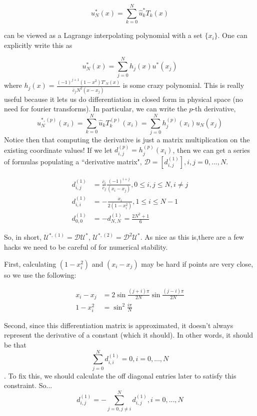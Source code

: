 \documentclass[12pt]{article}
\begin{document}
\begin{equation}
    u^*_{N}(x) = \sum_{k=0}^{N} \hat{u}^*_k T_k(x)
\end{equation}

can be viewed as a Lagrange interpolating polynomial with a set $\{x_i\}$. One can explicitly write this as

\begin{equation}
    u^*_{N}(x) = \sum_{j=0}^{N} h_j(x)u^*(x_j)
\end{equation}
where $h_j(x) = \frac{(-1)^{j+1}(1-x^2)T'_N(x)}{\bar{c}_j N^2 (x - x_j)}$ is some crazy polynomial. This is really useful because it lets us do differentiation in closed form in physical space (no need for fourier transforms). In particular, we can write the $p$-th derivative,
\begin{equation}
    u^{*, (p)}_{N}(x_i) = \sum_{k=0}^N \hat{u}_k T^{(p)}_k (x_i) = \sum_{j=0}^N h^{(p)}_j(x_i)u_N(x_j)
\end{equation}
Notice then that computing the derivative is just a matrix multiplication on the existing coordinate values! If we let $d_{i,j}^{(p)} = h_j^{(p)}(x_i)$, then we can get a series of formulas populating a ``derivative matrix", $\mathcal{D} = [d^{(1)}_{i,j}], i, j = 0 , ...,N$.

\begin{align*}
    d_{i,j}^{(1)} &= \frac{\bar{c}_i}{\bar{c}_j}\frac{(-1)^{i+j}}{(x_i - x_j)}, 0 \leq i,j \leq N , i \neq j\\
    d_{i,i}^{(1)} &= -\frac{x_i}{2(1-x_i^2)}, 1\leq i \leq N - 1\\
    d_{0,0}^{(1)} &= -d_{N, N}^{(1)} = \frac{2N^2 + 1}{6}
\end{align*}

So, in short, $\mathcal{U}^{*, (1)} = \mathcal{D}\mathcal{U}^{*}$,  $\mathcal{U}^{*, (2)} = \mathcal{D}^2\mathcal{U}^{*}$. As nice as this is,there are a few hacks we need to be careful of for numerical stability.

First, calculating $(1-x_i^2)$ and $(x_i - x_j)$ may be hard if points are very close, so we use the following:

\begin{align*}
    x_i - x_j &= 2\sin \frac{(j+i)\pi}{2N}\sin \frac{(j-i)\pi}{2N} \\
    1 - x_i^2 &= \sin^2 \frac{i \pi}{N}
\end{align*}

Second, since this differentiation matrix is approximated, it doesn't always represent the derivative of a constant (which it should). In other words, it should be that
\begin{equation}
    \sum_{j=0}^N d_{i,i}^{(1)} = 0, i = 0, ..., N
\end{equation}
. To fix this, we should calculate the off diagonal entries later to satisfy this constraint. So...
\begin{equation}
    d_{i,j}^{(1)} = -\sum_{j=0, j\neq i}^N d_{i,j}^{(1)}, i = 0, ..., N
\end{equation}
\end{document}
